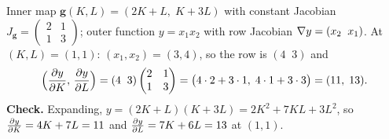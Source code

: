 \begin{solutions}
  \item Inner map $\mathbf{g}(K,L)=(2K+L,\;K+3L)$ with constant
        Jacobian
        $J_{\mathbf{g}}=\begin{pmatrix}2&1\\1&3\end{pmatrix}$; outer
        function $y=x_{1}x_{2}$ with row Jacobian
        $\nabla y=(x_{2}\;\;x_{1})$. At $(K,L)=(1,1)$:
        $(x_{1},x_{2})=(3,4)$, so the row is $(4\;\;3)$ and
        \[
          \Bigl(\frac{\partial y}{\partial K},\,\frac{\partial y}{\partial L}\Bigr)
            =(4\;\;3)\begin{pmatrix}2&1\\1&3\end{pmatrix}
            =\bigl(4\cdot 2+3\cdot 1,\;4\cdot 1+3\cdot 3\bigr)
            =(11,\;13) .
        \]
        \textbf{Check.} Expanding,
        $y=(2K+L)(K+3L)=2K^{2}+7KL+3L^{2}$, so
        $\frac{\partial y}{\partial K}=4K+7L=11$ and $\frac{\partial y}{\partial L}=7K+6L=13$ at $(1,1)$.
        \checkmark


\end{solutions}
